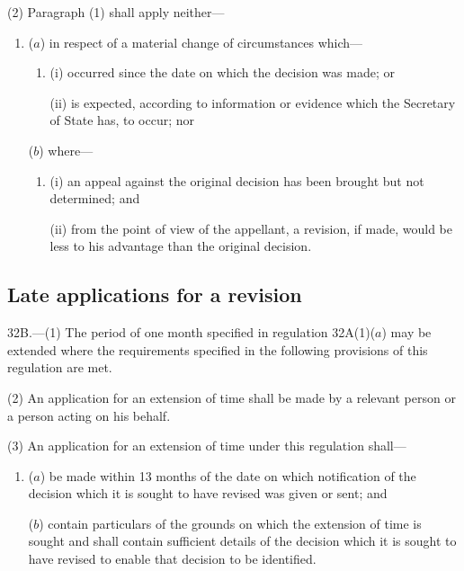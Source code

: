 \documentclass[12pt,a4paper]{article}
\begin{document}
(2) Paragraph (1) shall apply neither---
\begin{enumerate}\item[]
\begin{sloppypar}
($a$) in respect of a material change of circumstances which—
\end{sloppypar}
\begin{enumerate}\item[]
(i) occurred since 
the date on which the decision was made;  %
or

(ii) is expected, according to information or evidence which the Secretary of State has, to occur; nor
\end{enumerate}

($b$) where---
\begin{enumerate}\item[]
(i) an appeal against the original decision has been brought but not determined; and

(ii) from the point of view of the appellant, a revision, if made, would be less to his advantage than the original decision.
\end{enumerate}
\end{enumerate}


\subsection[32B. Late applications for a revision]{Late applications for a revision}

32B.—(1) The period of one month specified in regulation 32A(1)($a$) may be extended where the requirements specified in the following provisions of this regulation are met.

(2) An application for an extension of time shall be made by a relevant person or a person acting on his behalf.

(3) An application for an extension of time under this regulation shall---
\begin{enumerate}\item[]
($a$) be made within 13 months of the date on which notification of the decision which it is sought to have revised was given or sent; and

($b$) contain particulars of the grounds on which the extension of time is sought and shall contain sufficient details of the decision which it is sought to have revised to enable that decision to be identified.
\end{enumerate}
\end{document}
